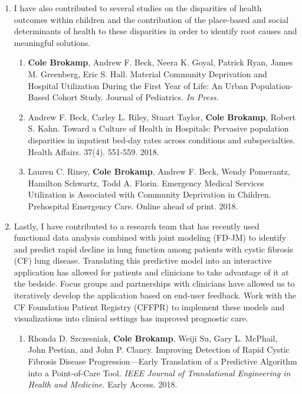 \documentclass{nihbiosketch}
\begin{document}
\begin{enumerate}
\begin{enumerate}
	
\end{enumerate}


\item I have also contributed to several studies on the disparities of health outcomes within children and the contribution of the place-based and social determinants of health to these disparities in order to identify root causes and meaningful solutions.

\begin{enumerate}

	\item \textbf{Cole Brokamp}, Andrew F. Beck, Neera K. Goyal, Patrick Ryan, James M. Greenberg, Eric S. Hall. Material Community Deprivation and Hospital Utilization During the First Year of Life: An Urban Population-Based Cohort Study. Journal of Pediatrics. \textit{In Press.}
	
	\item Andrew F. Beck, Carley L. Riley, Stuart Taylor, \textbf{Cole Brokamp}, Robert S. Kahn. Toward a Culture of Health in Hospitals: Pervasive population disparities in inpatient bed-day rates across conditions and subspecialties. Health Affairs. 37(4). 551-559. 2018.
		
	\item Lauren C. Riney, \textbf{Cole Brokamp}, Andrew F. Beck, Wendy Pomerantz, Hamilton Schwartz, Todd A. Florin. Emergency Medical Services Utilization is Associated with Community Deprivation in Children. Prehospital Emergency Care. Online ahead of print. 2018.


\end{enumerate}

\item Lastly, I have contributed to a research team that has recently used functional data analysis combined with joint modeling (FD-JM) to identify and predict rapid decline in lung function among patients with cystic fibrosis (CF) lung disease. Translating this predictive model into an interactive application has allowed for patients and clinicians to take advantage of it at the bedside.  Focus groups and partnerships with clinicians have allowed us to iteratively develop the application based on end-user feedback. Work with the CF Foundation Patient Registry (CFFPR) to implement these models and visualizations into clinical settings has improved prognostic care.

\begin{enumerate}
	
	\item Rhonda D. Szczesniak, \textbf{Cole Brokamp}, Weiji Su, Gary L. McPhail,
    John Pestian, and John P. Clancy. Improving Detection of Rapid Cystic
    Fibrosis Disease Progression—Early Translation of a Predictive Algorithm
    into a Point-of-Care Tool. \textit{IEEE Journal of Translational Engineering
      in Health and Medicine.} Early Access. 2018.


\end{enumerate}
\end{enumerate}
\end{document}
